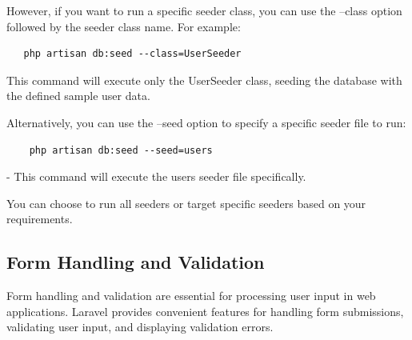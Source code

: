 \begin{enumerate}
\begin{enumerate}
  \medskip However, if you want to run a specific seeder class, you can use the --class option followed by the seeder class name. For example:
   
    \begin{verbatim}
   php artisan db:seed --class=UserSeeder
    \end{verbatim}
   This command will execute only the UserSeeder class, seeding the database with the defined sample user data.
   
   Alternatively, you can use the --seed option to specify a specific seeder file to run:
   \begin{verbatim}
    php artisan db:seed --seed=users
    \end{verbatim}
   - This command will execute the users seeder file specifically.
   
   You can choose to run all seeders or target specific seeders based on your requirements.
\end{enumerate}   
\end{enumerate}
\subsection{Form Handling and Validation}
Form handling and validation are essential for processing user input in web applications. Laravel provides convenient features for handling form submissions, validating user input, and displaying validation errors. 

